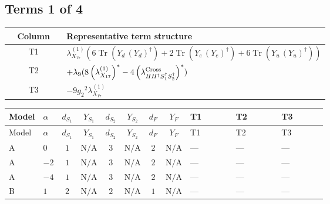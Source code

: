 \documentclass[8pt]{article}
\begin{document}
\begin{landscape}
\subsection*{Terms 1 of 4}
\begin{center}
\begin{tabular}{@{}c >{\raggedright\arraybackslash}p{0.82\linewidth}@{}}
\toprule
Column & Representative term structure \\
\midrule
T1 & \(\displaystyle {\lambda_{X_{17}}^{(1)}} (6 \operatorname{Tr}\!\left({Y_d}\,\left({Y_d}\right)^{\dagger}\right)+2 \operatorname{Tr}\!\left({Y_e}\,\left({Y_e}\right)^{\dagger}\right)+6 \operatorname{Tr}\!\left({Y_u}\,\left({Y_u}\right)^{\dagger}\right))\) \\
\midrule
T2 & \(\displaystyle +{\lambda_{9}} (8 \left({\lambda_{X_{17}}^{(1)}}\right)^{*}-4 \left({\lambda_{H H^\dagger S_1^\dagger S_2^\dagger}^{\rm Cross}}\right)^{*})\) \\
\midrule
T3 & \(\displaystyle -9 {g_2}^2 {\lambda_{X_{17}}^{(1)}}\) \\
\midrule
\bottomrule
\end{tabular}
\end{center}
\smallskip
\tiny
\begin{longtable}{@{}llcccccc >{\raggedright\arraybackslash}p{0.21\linewidth} >{\raggedright\arraybackslash}p{0.21\linewidth} >{\raggedright\arraybackslash}p{0.21\linewidth}@{}}
\toprule
Model & $\alpha$ & $d_{S_1}$ & $Y_{S_1}$ & $d_{S_2}$ & $Y_{S_2}$ & $d_F$ & $Y_F$ & T1 & T2 & T3 \\
\midrule
\endfirsthead
\toprule
Model & $\alpha$ & $d_{S_1}$ & $Y_{S_1}$ & $d_{S_2}$ & $Y_{S_2}$ & $d_F$ & $Y_F$ & T1 & T2 & T3 \\
\midrule
\endhead
A & $0$ & $1$ & $\text{N/A}$ & $3$ & $\text{N/A}$ & $2$ & $\text{N/A}$ & --- & --- & --- \\
\midrule
A & $-2$ & $1$ & $\text{N/A}$ & $3$ & $\text{N/A}$ & $2$ & $\text{N/A}$ & --- & --- & --- \\
\midrule
A & $-4$ & $1$ & $\text{N/A}$ & $3$ & $\text{N/A}$ & $2$ & $\text{N/A}$ & --- & --- & --- \\
\midrule
B & $1$ & $2$ & $\text{N/A}$ & $2$ & $\text{N/A}$ & $1$ & $\text{N/A}$ & --- & --- & --- \\
\midrule

\end{longtable}
\end{landscape}
\end{document}

